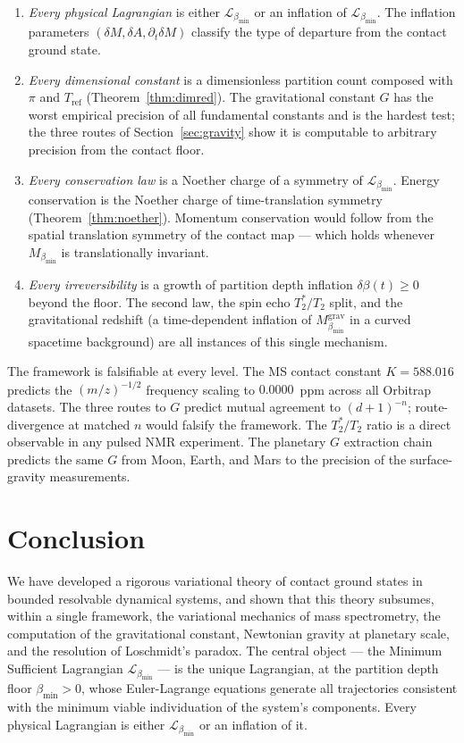 \documentclass[11pt,twocolumn,a4paper]{article}
\theoremstyle{plain}
\theoremstyle{definition}
\theoremstyle{remark}
\newcommand{\bmin}{\beta_{\min}}
\newcommand{\Lmin}{\mathcal{L}_{\bmin}}
\begin{document}
\begin{enumerate}[label=(\roman*)]
  \item \emph{Every physical Lagrangian} is either $\Lmin$ or an inflation of
  $\Lmin$. The inflation parameters $(\delta M, \delta A, \partial_t\delta M)$
  classify the type of departure from the contact ground state.
  \item \emph{Every dimensional constant} is a dimensionless partition count
  composed with $\pi$ and $T_{\mathrm{ref}}$ (Theorem~\ref{thm:dimred}).
  The gravitational constant $G$ has the worst empirical precision of all
  fundamental constants and is the hardest test; the three routes of
  Section~\ref{sec:gravity} show it is computable to arbitrary precision from
  the contact floor.
  \item \emph{Every conservation law} is a Noether charge of a symmetry of
  $\Lmin$. Energy conservation is the Noether charge of time-translation
  symmetry (Theorem~\ref{thm:noether}). Momentum conservation would follow
  from the spatial translation symmetry of the contact map --- which holds
  whenever $M_{\bmin}$ is translationally invariant.
  \item \emph{Every irreversibility} is a growth of partition depth inflation
  $\delta\beta(t) \geq 0$ beyond the floor. The second law, the spin echo
  $T_2^*/T_2$ split, and the gravitational redshift (a time-dependent inflation
  of $M_{\bmin}^{\mathrm{grav}}$ in a curved spacetime background) are all
  instances of this single mechanism.
\end{enumerate}

The framework is falsifiable at every level. The MS contact constant $K = 588.016$
predicts the $(m/z)^{-1/2}$ frequency scaling to $0.0000$~ppm across all
Orbitrap datasets. The three routes to $G$ predict mutual agreement to $(d+1)^{-n}$;
route-divergence at matched $n$ would falsify the framework. The $T_2^*/T_2$
ratio is a direct observable in any pulsed NMR experiment. The planetary $G$
extraction chain predicts the same $G$ from Moon, Earth, and Mars to the
precision of the surface-gravity measurements.

\section{Conclusion}
\label{sec:conclusion}

We have developed a rigorous variational theory of contact ground states in
bounded resolvable dynamical systems, and shown that this theory subsumes,
within a single framework, the variational mechanics of mass spectrometry,
the computation of the gravitational constant, Newtonian gravity at planetary
scale, and the resolution of Loschmidt's paradox. The central object --- the
Minimum Sufficient Lagrangian $\Lmin$ --- is the unique Lagrangian, at the
partition depth floor $\bmin > 0$, whose Euler-Lagrange equations generate all
trajectories consistent with the minimum viable individuation of the system's
components. Every physical Lagrangian is either $\Lmin$ or an inflation of it.
\end{document}
